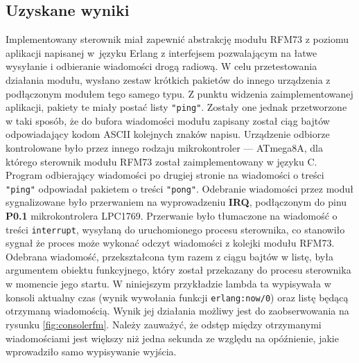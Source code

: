 \subsection{Uzyskane wyniki}

Implementowany sterownik miał zapewnić abstrakcję modułu RFM73 z poziomu aplikacji napisanej w~języku Erlang z interfejsem pozwalającym na łatwe wysyłanie i odbieranie wiadomości drogą radiową.
W celu przetestowania działania modułu, wysłano zestaw krótkich pakietów do innego urządzenia z podłączonym modułem tego samego typu.
Z punktu widzenia zaimplementowanej aplikacji, pakiety te miały postać listy \texttt{"ping"}. Zostały one jednak przetworzone w taki sposób, że do bufora wiadomości modułu zapisany został ciąg bajtów odpowiadający kodom ASCII kolejnych znaków napisu.
Urządzenie odbiorze kontrolowane było przez innego rodzaju mikrokontroler --- ATmega8A, dla którego sterownik modułu RFM73 został zaimplementowany w języku C.
Program odbierający wiadomości po drugiej stronie na wiadomości o treści \texttt{"ping"} odpowiadał pakietem o treści \texttt{"pong"}.
Odebranie wiadomości przez moduł sygnalizowane było przerwaniem na wyprowadzeniu \textbf{IRQ}, podłączonym do pinu \textbf{P0.1} mikrokontrolera LPC1769.
Przerwanie było tłumaczone na wiadomość o treści \texttt{interrupt}, wysyłaną do uruchomionego procesu sterownika, co stanowiło sygnał że proces może wykonać odczyt wiadomości z kolejki modułu RFM73.
Odebrana wiadomość, przekształcona tym razem z ciągu bajtów w listę, była argumentem obiektu funkcyjnego, który został przekazany do procesu sterownika w momencie jego startu.
W niniejszym przykładzie lambda ta wypisywała w konsoli aktualny czas (wynik wywołania funkcji \texttt{erlang:now/0}) oraz listę będącą otrzymaną wiadomością.
Wynik jej działania możliwy jest do zaobserwowania na rysunku \ref{fig:consolerfm}.
Należy zauważyć, że odstęp między otrzymanymi wiadomościami jest większy niż jedna sekunda ze względu na opóźnienie, jakie wprowadziło samo wypisywanie wyjścia.


